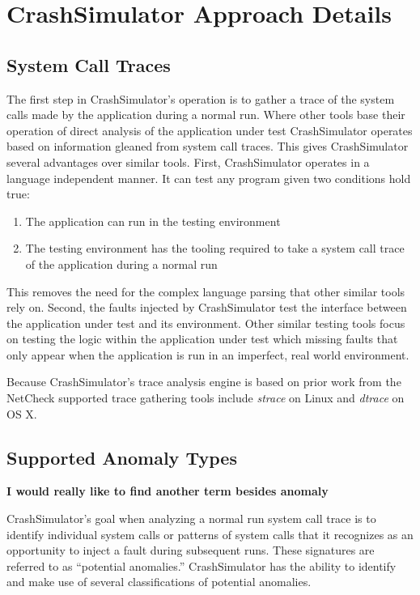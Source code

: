 \section{CrashSimulator Approach Details}

    \subsection{System Call Traces}

    The first step in CrashSimulator's operation is to gather a trace of the system
    calls made by the application during a normal run. Where other tools base their operation of direct analysis of the
    application under test CrashSimulator operates based on information gleaned from system call traces. This gives
    CrashSimulator several advantages over similar tools. First, CrashSimulator operates in a language independent
    manner. It can test any program given two conditions hold true:

    \begin{enumerate}
        \item{The application can run in the testing environment}
        \item{The testing environment has the tooling required to take a system call trace of the application during a
        normal run}
    \end{enumerate}

    This removes the need for the complex language parsing that other similar tools rely on. Second, the faults injected
    by CrashSimulator test the interface between the application under test and its environment. Other similar testing
    tools focus on testing the logic within the application under test which missing faults that only appear when the
    application is run in an imperfect, real world environment.

    Because CrashSimulator's trace analysis engine is based on prior work from the NetCheck supported trace gathering
    tools include \emph{strace} on Linux and \emph{dtrace} on OS X.


    \subsection{Supported Anomaly Types}

    \textbf{I would really like to find another term besides anomaly}

    CrashSimulator's goal when analyzing a normal run system call trace is to identify individual system calls or
    patterns of system calls that it recognizes as an opportunity to inject a fault during subsequent runs. These
    signatures are referred to as ``potential anomalies.'' CrashSimulator has the ability to identify and make use of
    several classifications of potential anomalies.

